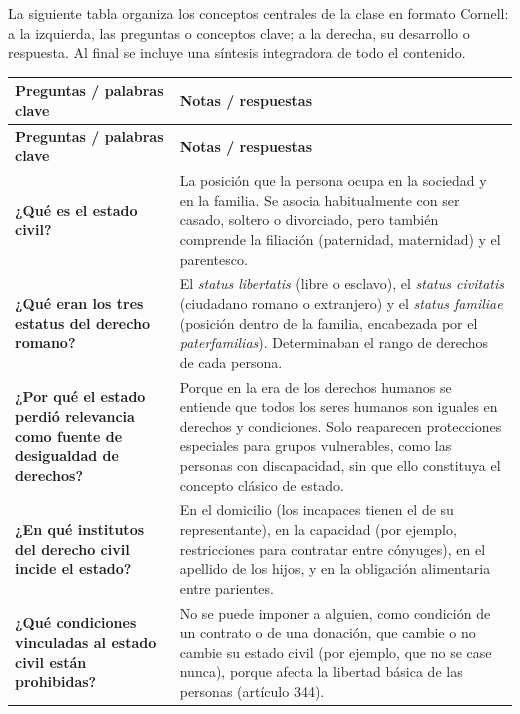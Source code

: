 \documentclass[12pt,oneside]{book}
\begin{document}
La siguiente tabla organiza los conceptos centrales de la clase en formato Cornell: a la izquierda, las preguntas o conceptos clave; a la derecha, su desarrollo o respuesta. Al final se incluye una síntesis integradora de todo el contenido.

\begin{longtable}{
    >{\raggedright\arraybackslash}p{}
    >{\raggedright\arraybackslash}p{}
}
\toprule
\textbf{Preguntas / palabras clave} & \textbf{Notas / respuestas} \\
\midrule
\endfirsthead

\toprule
\textbf{Preguntas / palabras clave} & \textbf{Notas / respuestas} \\
\midrule
\endhead

\bottomrule
\endfoot

\bottomrule
\endlastfoot

\textbf{¿Qué es el estado civil?} &
La posición que la persona ocupa en la sociedad y en la familia. Se asocia habitualmente con ser casado, soltero o divorciado, pero también comprende la filiación (paternidad, maternidad) y el parentesco. \\

\textbf{¿Qué eran los tres estatus del derecho romano?} &
El \textit{status libertatis} (libre o esclavo), el \textit{status civitatis} (ciudadano romano o extranjero) y el \textit{status familiae} (posición dentro de la familia, encabezada por el \textit{paterfamilias}). Determinaban el rango de derechos de cada persona. \\

\textbf{¿Por qué el estado perdió relevancia como fuente de desigualdad de derechos?} &
Porque en la era de los derechos humanos se entiende que todos los seres humanos son iguales en derechos y condiciones. Solo reaparecen protecciones especiales para grupos vulnerables, como las personas con discapacidad, sin que ello constituya el concepto clásico de estado. \\

\textbf{¿En qué institutos del derecho civil incide el estado?} &
En el domicilio (los incapaces tienen el de su representante), en la capacidad (por ejemplo, restricciones para contratar entre cónyuges), en el apellido de los hijos, y en la obligación alimentaria entre parientes. \\

\textbf{¿Qué condiciones vinculadas al estado civil están prohibidas?} &
No se puede imponer a alguien, como condición de un contrato o de una donación, que cambie o no cambie su estado civil (por ejemplo, que no se case nunca), porque afecta la libertad básica de las personas (artículo 344). \\


\end{longtable}
\end{document}
